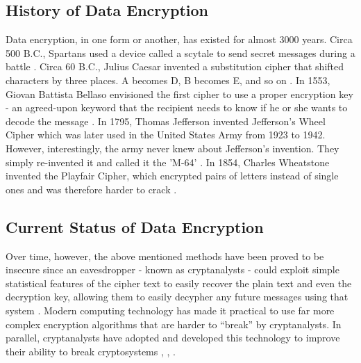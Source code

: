 \documentclass[journal]{IEEEtran}
\begin{document}
\subsection{\textbf{History of Data Encryption}}
Data encryption, in one form or another, has existed for almost 3000 years. Circa 500 B.C., Spartans used a device called a scytale to send secret messages during a battle \cite{encryption_research}. Circa 60 B.C., Julius Caesar invented a substitution cipher that shifted characters by three places. A becomes D, B becomes E, and so on \cite{encryption_research}. In 1553, Giovan Battista Bellaso envisioned the first cipher to use a proper encryption key - an agreed-upon keyword that the recipient needs to know if he or she wants to decode the message \cite{encryption_history}. In 1795, Thomas Jefferson invented Jefferson's Wheel Cipher which was later used in the United States Army from 1923 to 1942. However, interestingly, the army never knew about Jefferson's invention. They simply re-invented it and called it the 'M-64' \cite{encryption_research}. In 1854, Charles Wheatstone invented the Playfair Cipher, which encrypted pairs of letters instead of single ones and was therefore harder to crack \cite{encryption_history}.

\subsection{\textbf{Current Status of Data Encryption}}
Over time, however, the above mentioned methods have been proved to be insecure since an eavesdropper - known as cryptanalysts - could exploit simple statistical features of the cipher text to easily recover the plain text and even the decryption key, allowing them to easily decypher any future messages using that system \cite{encryption_today}. Modern computing technology has made it practical to use far more complex encryption algorithms that are harder to “break” by cryptanalysts. In parallel, cryptanalysts have adopted and developed this technology to improve their ability to break cryptosystems \cite{des_cryptanalysis}, \cite{rijndael_cryptanalysis}, \cite{rsa_cryptanalysis}. 
\end{document}
